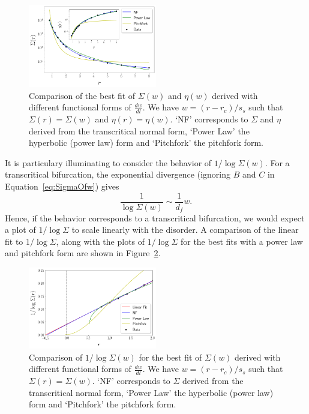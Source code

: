 \documentclass[reprint,amsmath,amssymb,aps,floatfix, prl]{revtex4-1}
\begin{document}
\begin{figure}
		\includegraphics[width=0.5\textwidth]{comparison.png}
		\caption{ Comparison of the best fit of $\Sigma(w)$ and $\eta(w)$ derived with different functional forms of $\frac{dw}{dl}$. We have $w=(r-r_c)/s_s$ such that $\Sigma(r)=\Sigma(w)$ and $\eta(r)=\eta(w)$. `NF' corresponds to $\Sigma$ and $\eta$ derived from the transcritical normal form, `Power Law' the hyperbolic (power law) form and `Pitchfork' the pitchfork form.}
		\label{fig:comparison}
\end{figure}
%
It is particulary illuminating to consider the behavior of $1/\log\Sigma(w)$. For a transcritical bifurcation, the exponential divergence (ignoring $B$ and $C$ in Equation~\ref{eq:SigmaOfw}) gives
%
\begin{equation}
	\frac{1}{\log\Sigma(w)} \sim \frac{1}{d_f} w .
\end{equation}
%
\noindent Hence, if the behavior corresponds to a transcritical bifurcation, we would expect a plot of $1/\log\Sigma$ to scale linearly with the disorder. A comparison of the linear fit to $1/\log\Sigma$, along with the plots of $1/\log\Sigma$ for the best fits with a power law and pitchfork form are shown in Figure~\ref{fig:logplot}.
%
\begin{figure}
		\includegraphics[width=0.5\textwidth]{logplot.png}
		\caption{Comparison of $1/\log\Sigma(w)$ for the best fit of $\Sigma(w)$ derived with different functional forms of $\frac{dw}{dl}$. We have $w=(r-r_c)/s_s$ such that $\Sigma(r)=\Sigma(w)$. `NF' corresponds to $\Sigma$ derived from the transcritical normal form, `Power Law' the hyperbolic (power law) form and `Pitchfork' the pitchfork form.}
		\label{fig:logplot}
\end{figure}
\end{document}
